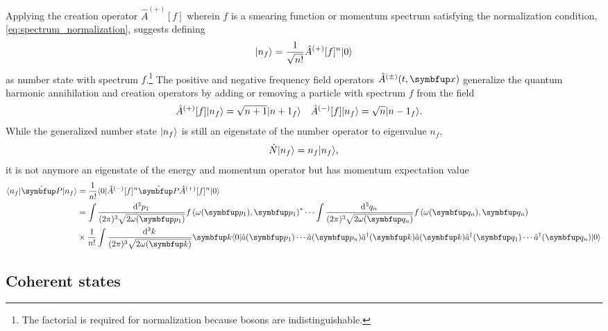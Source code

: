 Applying the creation operator $\hat{A}^{(+)}[f]$ wherein $f$ is a smearing function or momentum spectrum satisfying the normalization condition, \cref{eq:spectrum_normalization}, suggests defining
\begin{equation}
	\lvert n_f\rangle
	=
	\frac{1}{\sqrt{n!}}
	\hat{A}^{(+)}[f]^n
	\lvert0\rangle
	\label{eq:number_state}
\end{equation}
as number state with spectrum $f$.\footnote{The factorial is required for normalization because bosons are indistinguishable.}
The positive and negative frequency field operators $\hat{A}^{(\pm)}(t,\vb{x})$ generalize the quantum harmonic annihilation and creation operators by adding or removing a particle with spectrum $f$ from the field
\begin{align}
	\hat{A}^{(+)}[f]
	\lvert n_f\rangle
	&=
	\sqrt{n+1}
	\lvert{n+1}_f\rangle
	&
	\hat{A}^{(-)}[f]
	\lvert n_f\rangle
	&=
	\sqrt{n}
	\lvert{n-1}_f\rangle
	.
\end{align}
While the generalized number state $\lvert n_f\rangle$ is still an eigenstate of the number operator to eigenvalue $n_f$,
\begin{equation}
	\hat{N}
	\lvert n_f\rangle
	=
	n_f
	\lvert n_f\rangle
	,
\end{equation}
it is not anymore an eigenstate of the energy and momentum operator but has momentum expectation value
\begin{equation}
	\begin{split}
		\bra{n_f}
		\vu{P}
		\ket{n_f}
		&=
		\frac{1}{n!}
		\bra{0}
		\hat{A}^{(-)}[f]^n
		\vu{P}
		\hat{A}^{(+)}[f]^n
		\ket{0}
		\\
		&=
		\int\frac{\dd[3]{p_1}}{(2\pi)^3\sqrt{2\omega(\vb{p}_1)}}
		f\left(\omega(\vb{p}_1),\vb{p}_1\right)^*
		\cdots
		\int\frac{\dd[3]{q_n}}{(2\pi)^3\sqrt{2\omega(\vb{q}_n)}}
		f\left(\omega(\vb{q}_n),\vb{q}_n\right)
		\\
		&\times
		\frac{1}{n!}
		\int\frac{\dd[3]{k}}{(2\pi)^3\sqrt{2\omega(\vb{k})}}
		\vb{k}
		\bra{0}
		\hat{a}(\vb{p}_1)
		\cdots
		\hat{a}(\vb{p}_n)
		\hat{a}^\dagger(\vb{k})
		\hat{a}(\vb{k})
		\hat{a}^\dagger(\vb{q}_1)
		\cdots
		\hat{a}^\dagger(\vb{q}_n)
		\ket{0}	
	\end{split}
\end{equation}

\subsection{Coherent states}


